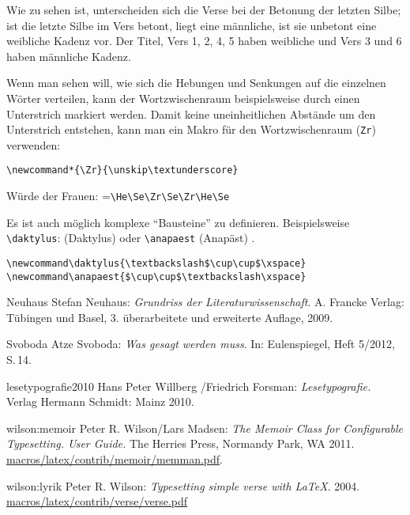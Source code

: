 Wie zu sehen ist, unterscheiden sich die Verse bei der Betonung der letzten 
Silbe; ist die letzte Silbe im Vers betont, liegt eine männliche, ist sie unbetont
eine weibliche Kadenz
vor. Der Titel, Vers 1, 2, 4, 5 haben weibliche und Vers 3 und 6 haben 
männliche Kadenz.

Wenn man sehen will, wie sich die Hebungen und Senkungen auf die
einzelnen Wörter verteilen, kann der Wortzwischenraum beispielsweise
durch einen Unterstrich markiert werden. Damit keine uneinheitlichen Abstände 
um den Unterstrich entstehen, kann man ein Makro für
den Wortzwischenraum (\verb|Zr|) verwenden:

\verb|\newcommand*{\Zr}{\unskip\textunderscore}|

Würde der Frauen: \He\Se\Zr\Se\Zr\He\Se =\verb|\He\Se\Zr\Se\Zr\He\Se|



Es ist auch möglich komplexe "`Bausteine"' zu definieren. Beispielsweise
\verb|\daktylus|: \daktylus{} (Daktylus) oder \verb|\anapaest| (Anapäst) 
\anapaest.

\begin{lstlisting}
\newcommand\daktylus{\textbackslash$\cup\cup$\xspace} 
\newcommand\anapaest{$\cup\cup$\textbackslash\xspace} 
\end{lstlisting}

\small
\begin{thebibliography}{1000}
\bibitem
{Neuhaus} Stefan Neuhaus:
\textsl{Grundriss der Literaturwissenschaft}. 
A. Francke Verlag: Tübingen und Basel, 3. überarbeitete und erweiterte Auf\/lage, 
2009.

\bibitem
{Svoboda} Atze Svoboda:
\textsl{Was gesagt werden muss}.
In: Eulenspiegel, Heft 5/2012, S.\,14.

\bibitem
{lesetypografie2010} Hans Peter Willberg /Friedrich Forsman:
\textsl{Lesetypografie.}
Verlag Hermann Schmidt: Mainz 2010.

\bibitem
{wilson:memoir} Peter R. Wilson/Lars Madsen:
\textsl{The Memoir Class for Configurable Typesetting. User Guide.}
The Herries Press, Normandy Park, WA 2011.
\url{macros/latex/contrib/memoir/memman.pdf}.

\bibitem
{wilson:lyrik} Peter R. Wilson:
\textsl{Typesetting simple verse with \LaTeX }. 2004.
\url{macros/latex/contrib/verse/verse.pdf}
\end{thebibliography}

%



%
